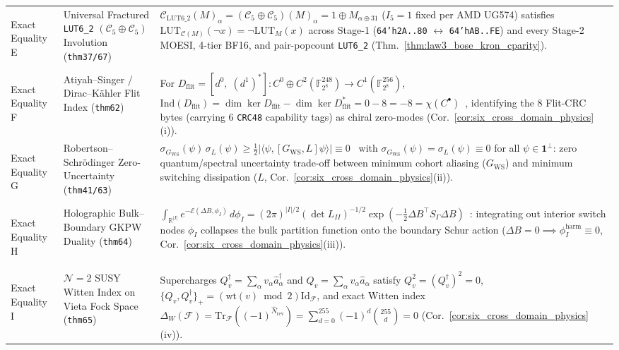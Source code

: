 \documentclass[11pt,letterpaper]{article}
\theoremstyle{spectralthm}
\begin{document}
\begin{table}[!htp]
{\begin{minipage}{1.14\textwidth}
\begin{tabularx}{\textwidth}{@{}>{\bfseries\raggedright\arraybackslash}p{2.05cm} >{\raggedright\arraybackslash}p{3.40cm} >{\raggedright\arraybackslash}X@{}}
\addlinespace[1.2pt]
Exact Equality E & Universal Fractured \texttt{LUT6\_2} $(\mathcal{C}_5\oplus\mathcal{C}_5)$ Involution (\texttt{thm37/67}) & $\mathcal{C}_{\mathrm{LUT6\_2}}(M)_\alpha = (\mathcal{C}_5\oplus\mathcal{C}_5)(M)_\alpha = 1 \oplus M_{\alpha\oplus 31}$ ($I_5=1$ fixed per AMD UG574) satisfies $\mathrm{LUT}_{\mathcal{C}(M)}(\neg x) = \neg\mathrm{LUT}_M(x)$ across Stage-1 (\texttt{64'h2A..80} $\leftrightarrow$ \texttt{64'hAB..FE}) and every Stage-2 MOESI, 4-tier BF16, and pair-popcount \texttt{LUT6\_2} (Thm.~\ref{thm:law3_bose_kron_cparity}). \\
\addlinespace[1.2pt]
Exact Equality F & Atiyah--Singer / Dirac--K\"{a}hler Flit Index (\texttt{thm62}) & For $D_{\mathrm{flit}} = [d^0,\;(d^1)^*] : C^0 \oplus C^2(\mathbb{F}_{2^8}^{248}) \to C^1(\mathbb{F}_{2^8}^{256})$, $\mathrm{Ind}(D_{\mathrm{flit}}) = \dim\ker D_{\mathrm{flit}} - \dim\ker D_{\mathrm{flit}}^* = 0 - 8 = -8 = \chi(C^\bullet)$~\cite{atiyah1968index, kahler1962innerer}, identifying the 8 Flit-CRC bytes (carrying 6 \texttt{CRC48} capability tags) as chiral zero-modes (Cor.~\ref{cor:six_cross_domain_physics}(i)). \\
\addlinespace[1.2pt]
Exact Equality G & Robertson--Schr\"{o}dinger Zero-Uncertainty (\texttt{thm41/63}) & $\sigma_{G_{\mathrm{WS}}}(\psi)\,\sigma_L(\psi) \ge \frac{1}{2}|\langle\psi,[G_{\mathrm{WS}},L]\psi\rangle| \equiv 0$~\cite{robertson1929uncertainty, schrodinger1930heisenbergschen} with $\sigma_{G_{\mathrm{WS}}}(\psi) = \sigma_L(\psi) \equiv 0$ for all $\psi \in \mathbf{1}^\perp$: zero quantum/spectral uncertainty trade-off between minimum cohort aliasing ($G_{\mathrm{WS}}$) and minimum switching dissipation ($L$, Cor.~\ref{cor:six_cross_domain_physics}(ii)). \\
\addlinespace[1.2pt]
Exact Equality H & Holographic Bulk--Boundary GKPW Duality (\texttt{thm64}) & $\int_{\mathbb{R}^{|I|}} e^{-\mathcal{E}(\Delta B,\phi_I)}\,d\phi_I = (2\pi)^{|I|/2}(\det L_{II})^{-1/2}\exp(-\frac{1}{2}\Delta B^\top S_\Gamma \Delta B)$~\cite{gubser1998gauge, witten1998anti}: integrating out interior switch nodes $\phi_I$ collapses the bulk partition function onto the boundary Schur action ($\Delta B = 0 \implies \phi_I^{\mathrm{harm}} \equiv 0$, Cor.~\ref{cor:six_cross_domain_physics}(iii)). \\
\addlinespace[1.2pt]
Exact Equality I & $\mathcal{N}=2$ SUSY Witten Index on Vieta Fock Space (\texttt{thm65}) & Supercharges $Q_v^\dagger = \sum_\alpha v_\alpha \hat{a}_\alpha^\dagger$ and $Q_v = \sum_\alpha v_\alpha \hat{a}_\alpha$ satisfy $Q_v^2 = (Q_v^\dagger)^2 = 0$, $\{Q_v,Q_v^\dagger\}_+ = (\mathrm{wt}(v)\bmod 2)\mathrm{Id}_{\mathcal{F}}$, and exact Witten index~\cite{witten1982constraints} $\Delta_W(\mathcal{F}) = \mathrm{Tr}_{\mathcal{F}}((-1)^{\hat{N}_{\mathrm{rev}}}) = \sum_{d=0}^{255}(-1)^d\binom{255}{d} = 0$ (Cor.~\ref{cor:six_cross_domain_physics}(iv)). \\

\end{tabularx}
\end{minipage}}
\end{table}
\end{document}
